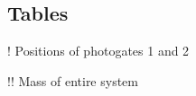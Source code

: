 \begin{landscape}

\subsection{Tables}

\begin{table}[H]
\captionsetup{font=Large}
\caption{Known values}
\centering
\begin{threeparttable}
\begin{tablenotes}\normalsize
	\item[!] Positions of photogates 1 and 2
	\item[!!] Mass of entire system
\end{tablenotes}
\end{threeparttable}
\label{tab:knownsTab}
\end{table}

\vspace{-0.5cm}


\end{landscape}
